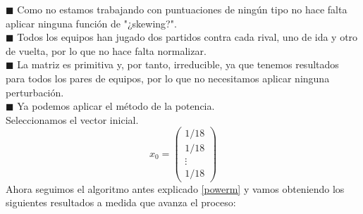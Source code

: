 	$\blacksquare $ Como no estamos trabajando con puntuaciones de ningún tipo no hace falta aplicar ninguna función de "¿skewing?".\\
	
	$\blacksquare $ Todos los equipos han jugado dos partidos contra cada rival, uno de ida y otro de vuelta, por lo que no hace falta normalizar.\\ 
	
	$\blacksquare $ La matriz es primitiva y, por tanto, irreducible, ya que tenemos resultados para todos los pares de equipos, por lo que no necesitamos aplicar ninguna perturbación.\\
	
	$\blacksquare $ Ya podemos aplicar el método de la potencia.\\
	Seleccionamos el vector inicial.
	\begin{equation*}
	x_{0} = 
	\left( \begin{array}{c}
	1/18\\
	1/18\\
	\vdots\\
	1/18
	\end{array}\right) 
	\end{equation*}
	Ahora seguimos el algoritmo antes explicado \ref{powerm} y vamos obteniendo los siguientes resultados a medida que avanza el proceso:
	
